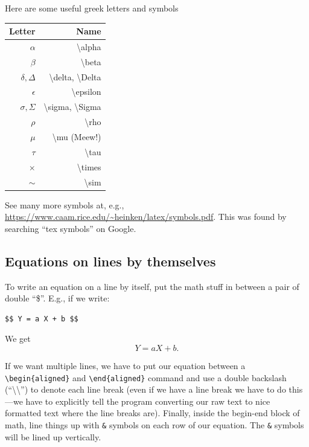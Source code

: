 \documentclass[
  letterpaper,
  DIV=11,
  numbers=noendperiod]{scrreprt}
\begin{document}
Here are some useful greek letters and symbols

\begin{longtable}[]{@{}rr@{}}
\toprule\noalign{}
Letter & Name \\
\midrule\noalign{}
\endhead
\bottomrule\noalign{}
\endlastfoot
\(\alpha\) & \textbackslash alpha \\
\(\beta\) & \textbackslash beta \\
\(\delta, \Delta\) & \textbackslash delta, \textbackslash Delta \\
\(\epsilon\) & \textbackslash epsilon \\
\(\sigma, \Sigma\) & \textbackslash sigma, \textbackslash Sigma \\
\(\rho\) & \textbackslash rho \\
\(\mu\) & \textbackslash mu (Meew!) \\
\(\tau\) & \textbackslash tau \\
\(\times\) & \textbackslash times \\
\(\sim\) & \textbackslash sim \\
\end{longtable}

See many more symbols at, e.g.,
\url{https://www.caam.rice.edu/~heinken/latex/symbols.pdf}. This was
found by searching ``tex symbols'' on Google.

\subsection{Equations on lines by
themselves}\label{equations-on-lines-by-themselves}

To write an equation on a line by itself, put the math stuff in between
a pair of double ``\$''. E.g., if we write:

\begin{verbatim}
$$ Y = a X + b $$
\end{verbatim}

We get \[ Y = a X + b .\]

If we want multiple lines, we have to put our equation between a
\texttt{\textbackslash{}begin\{aligned\}} and
\texttt{\textbackslash{}end\{aligned\}} command and use a double
backslash (``\textbackslash\textbackslash{}'') to denote each line break
(even if we have a line break we have to do this---we have to explicitly
tell the program converting our raw text to nice formatted text where
the line breaks are). Finally, inside the begin-end block of math, line
things up with \texttt{\&} symbols on each row of our equation. The
\texttt{\&} symbols will be lined up vertically.
\end{document}
